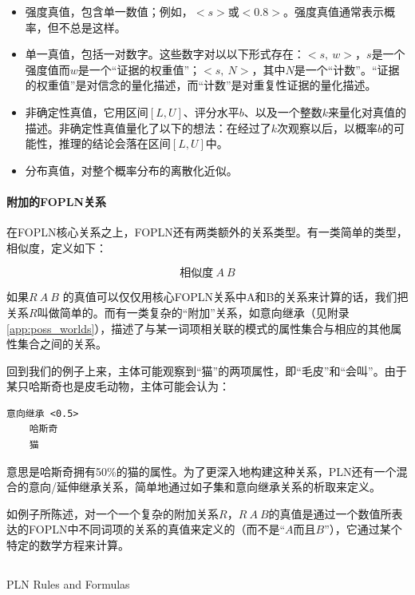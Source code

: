 \begin{itemize}
\item 强度真值，包含单一数值；例如，$<s>$或$<0.8>$。强度真值通常表示概率，但不总是这样。
\item 单一真值，包括一对数字。这些数字对以以下形式存在：$<s,\ w>$，$s$是一个强度值而$w$是一个“证据的权重值”；$<s,\ N>$，其中$N$是一个“计数”。“证据的权重值”是对信念的量化描述，而“计数”是对重复性证据的量化描述。
\item 非确定性真值，它用区间$[L,U]$、评分水平$b$、以及一个整数$k$来量化对真值的描述。非确定性真值量化了以下的想法：在经过了$k$次观察以后，以概率$b$的可能性，推理的结论会落在区间$[L,U]$中。
\item 分布真值，对整个概率分布的离散化近似。
\end{itemize}

\paragraph{附加的FOPLN关系}

在FOPLN核心关系之上，FOPLN还有两类额外的关系类型。有一类简单的类型，相似度，定义如下：

$$
相似度 \ A \ B
$$

如果$R \ A \ B$ 的真值可以仅仅用核心FOPLN关系中A和B的关系来计算的话，我们把关系$R$叫做简单的。而有一类复杂的“附加”关系，如意向继承（见附录\ref{app:poss_worlds}），描述了与某一词项相关联的模式的属性集合与相应的其他属性集合之间的关系。

回到我们的例子上来，主体可能观察到“猫”的两项属性，即“毛皮”和“会叫”。由于某只哈斯奇也是皮毛动物，主体可能会认为：

{\tt\begin{small}\begin{lstlisting}
意向继承 <0.5>
	哈斯奇  
	猫
\end{lstlisting}\end{small}}

意思是哈斯奇拥有50\%的猫的属性。为了更深入地构建这种关系，PLN还有一个混合的意向/延伸继承关系，简单地通过如子集和意向继承关系的析取来定义。

如例子所陈述，对一个一个复杂的附加关系$R$，$R \ A \ B$的真值是通过一个数值所表达的FOPLN中不同词项的关系的真值来定义的（而不是“$A$而且$B$”），它通过某个特定的数学方程来计算。

\subsection{}{PLN Rules and Formulas}

